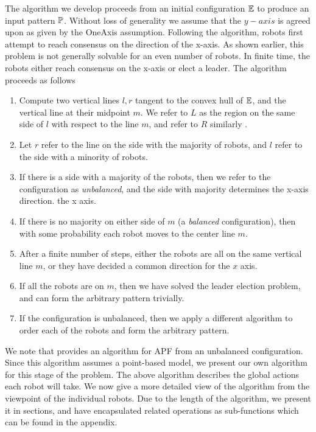 \documentclass[preprint,10pt]{elsarticle}
\begin{document}
	The algorithm we develop proceeds from an initial configuration $\mathbb{E}$ to produce an input pattern $\mathbb{P}$.
	Without loss of generality we assume that the $y-axis$ is agreed upon as given by the OneAxis assumption.
	Following the algorithm, robots first attempt to reach consensus on the direction of the x-axis. 
	As shown earlier, this problem is not generally solvable for an even number of robots. In finite time, 
	the robots either reach consensus on the x-axis or elect a leader. The algorithm proceeds as follows
	\begin{enumerate}
		\item Compute two vertical lines $l,r$ tangent to the convex hull of $\mathbb{E}$, and the vertical line
		at their midpoint $m$. We refer to $L$ as the region on the same side of $l$ with respect to 
		the line $m$, and refer to $R$ similarly .
		\item Let $r$ refer to the line on the side with the majority of robots, and $l$ refer to the side
		with a minority of robots.
		\item If there is a side with a majority of the robots, then we refer to the configuration as
		\textit{unbalanced}, and the side with majority determines the x-axis direction.
		the x axis.
		\item If there is no majority on either side of $m$ (a \textit{balanced } configuration), 
		then with some probability each robot moves to the center line $m$. 
		\item After a finite number of steps, either the robots are all on the same vertical line $m$,
		or they have decided a common direction for the $x$ axis.
		\item If all the robots are on $m$, then we have solved the leader election problem, and 
		can form the arbitrary pattern trivially.
		\item If the configuration is unbalanced, then we apply a different algorithm to order each
		of the robots and form the arbitrary pattern.
	\end{enumerate}

	We note that \cite{flocchini12distrib} provides an algorithm for APF from an unbalanced configuration.
	Since this algorithm assumes a point-based model, we present our own algorithm for this stage of
	the problem. The above algorithm describes the global actions each robot will take. 
	We now give a more detailed view of the algorithm from the viewpoint of the individual robots.
	Due to the length of the algorithm, we present it in sections, and have encapsulated related 
	operations as sub-functions which can be found in the appendix.
\end{document}
